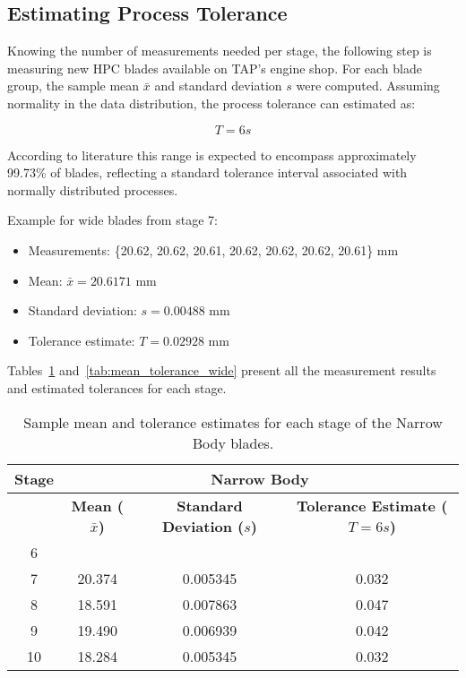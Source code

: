 \subsection{Estimating Process Tolerance}

Knowing the number of measurements needed per stage, the following step is measuring new \gls{HPC} blades available on \gls{TAP}'s engine shop.
For each blade group, the sample mean \(\bar{x}\) and standard deviation \(s\) were computed. Assuming normality in the data distribution, the process tolerance can estimated as:

\[
T = 6s
\]

According to literature this range is expected to encompass approximately 99.73\% of blades, reflecting a standard tolerance interval associated with normally distributed processes.

Example for wide blades from stage 7:

\begin{itemize}
    \item Measurements: \{20.62, 20.62, 20.61, 20.62, 20.62, 20.62, 20.61\} mm
    \item Mean: \(\bar{x} = 20.6171\) mm
    \item Standard deviation: \(s = 0.00488\) mm
    \item Tolerance estimate: \(T = 0.02928\) mm
\end{itemize}

Tables~\ref{tab:mean_tolerance_narrow} and~\ref{tab:mean_tolerance_wide} present all the measurement results and estimated tolerances for each stage.

\begin{table}[H]
    \centering
    \caption{Sample mean and tolerance estimates for each stage of the Narrow Body blades.}
    \label{tab:mean_tolerance_narrow}
    \begin{tabular}{cccc}
        \hline
        \textbf{Stage} & \multicolumn{3}{c|}{\textbf{Narrow Body}} \\
        \hline
        & \textbf{Mean (\( \bar{x} \))} & \textbf{Standard Deviation (\( s \))} & \textbf{Tolerance Estimate (\( T = 6s \))} \\
        \hline
        6  &  &  &  \\
        7  & 20.374 & 0.005345 & 0.032 \\
        8  & 18.591 & 0.007863  & 0.047 \\
        9  & 19.490 & 0.006939  & 0.042 \\
        10 & 18.284 & 0.005345  & 0.032 \\
        \hline
    \end{tabular}
\end{table}


